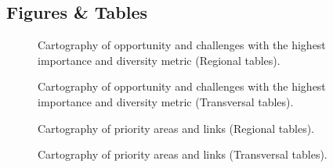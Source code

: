 {%


\newpage
\begin{center}
\section*{Figures \& Tables}
\end{center}




\begin{figure}[h!]
\caption{Cartography of opportunity and challenges  with the highest importance and diversity metric (Regional tables).}
\label{fig:reg_AC}
\end{figure}
\clearpage

\begin{figure}[h!]
\caption{Cartography of opportunity and challenges  with the highest importance and diversity metric (Transversal tables).}
\label{fig:trans_AC}
\end{figure}
\clearpage


\begin{figure}[h!]
\caption{Cartography of priority areas and links (Regional tables).}
\label{fig:reg}
\end{figure}
\clearpage

\begin{figure}[h!]
\caption{Cartography of priority areas and links (Transversal tables).}
\label{fig:trans}
\end{figure}
\clearpage

}
